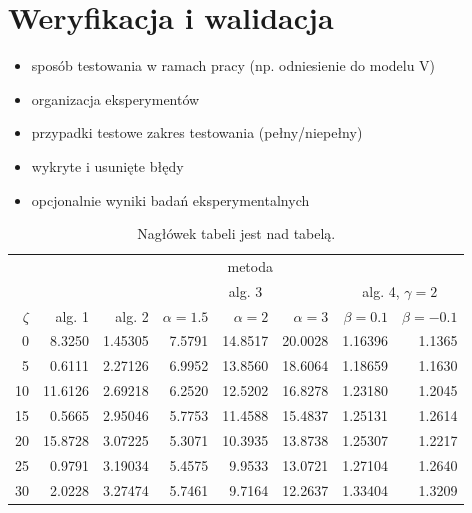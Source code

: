 \documentclass[a4paper,twoside,12pt]{book}
\begin{document}
\chapter{Weryfikacja i walidacja}
\label{ch:06}
\begin{itemize}
\item sposób testowania w ramach pracy (np. odniesienie do modelu V)
\item organizacja eksperymentów
\item przypadki testowe zakres testowania (pełny/niepełny)
\item wykryte i usunięte błędy
\item opcjonalnie wyniki badań eksperymentalnych
\end{itemize}

\begin{table}
\centering
\caption{Nagłówek tabeli jest nad tabelą.}
\label{id:tab:wyniki}
\begin{tabular}{rrrrrrrr}
\toprule
	         &                                     \multicolumn{7}{c}{metoda}                                      \\
	         \cmidrule{2-8}
	         &         &         &        \multicolumn{3}{c}{alg. 3}        & \multicolumn{2}{c}{alg. 4, $\gamma = 2$} \\
	         \cmidrule(r){4-6}\cmidrule(r){7-8}
	$\zeta$ &     alg. 1 &   alg. 2 & $\alpha= 1.5$ & $\alpha= 2$ & $\alpha= 3$ &   $\beta = 0.1$  &   $\beta = -0.1$ \\
\midrule
	       0 &  8.3250 & 1.45305 &       7.5791 &    14.8517 &    20.0028 & 1.16396 &                       1.1365 \\
	       5 &  0.6111 & 2.27126 &       6.9952 &    13.8560 &    18.6064 & 1.18659 &                       1.1630 \\
	      10 & 11.6126 & 2.69218 &       6.2520 &    12.5202 &    16.8278 & 1.23180 &                       1.2045 \\
	      15 &  0.5665 & 2.95046 &       5.7753 &    11.4588 &    15.4837 & 1.25131 &                       1.2614 \\
	      20 & 15.8728 & 3.07225 &       5.3071 &    10.3935 &    13.8738 & 1.25307 &                       1.2217 \\
	      25 &  0.9791 & 3.19034 &       5.4575 &     9.9533 &    13.0721 & 1.27104 &                       1.2640 \\
	      30 &  2.0228 & 3.27474 &       5.7461 &     9.7164 &    12.2637 & 1.33404 &                       1.3209 \\

\end{tabular}
\end{table}
\end{document}

